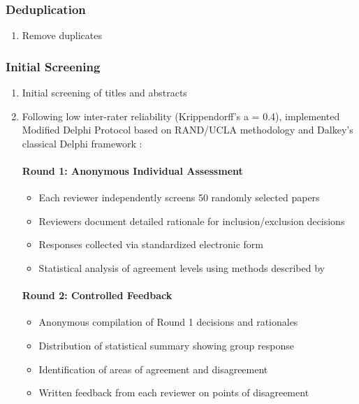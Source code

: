 \documentclass[a4paper,12pt]{article}
\begin{document}
\subsubsection{Deduplication}

\begin{enumerate}
\item Remove duplicates

\end{enumerate}

\subsubsection{Initial Screening}

\begin{enumerate}
    \item Initial screening of titles and abstracts
    \item Following low inter-rater reliability (Krippendorff's a = 0.4), implemented Modified Delphi Protocol based on RAND/UCLA methodology \citep{fitch2001rand} and Dalkey's classical Delphi framework \citep{dalkey1969delphi}:

    \paragraph{Round 1: Anonymous Individual Assessment}
    \begin{itemize}
        \item Each reviewer independently screens 50 randomly selected papers
        \item Reviewers document detailed rationale for inclusion/exclusion decisions
        \item Responses collected via standardized electronic form
        \item Statistical analysis of agreement levels using methods described by \citet{diamond2014results}
    \end{itemize}

    \paragraph{Round 2: Controlled Feedback}
    \begin{itemize}
        \item Anonymous compilation of Round 1 decisions and rationales
        \item Distribution of statistical summary showing group response
        \item Identification of areas of agreement and disagreement
        \item Written feedback from each reviewer on points of disagreement
    \end{itemize}


\end{enumerate}
\end{document}
